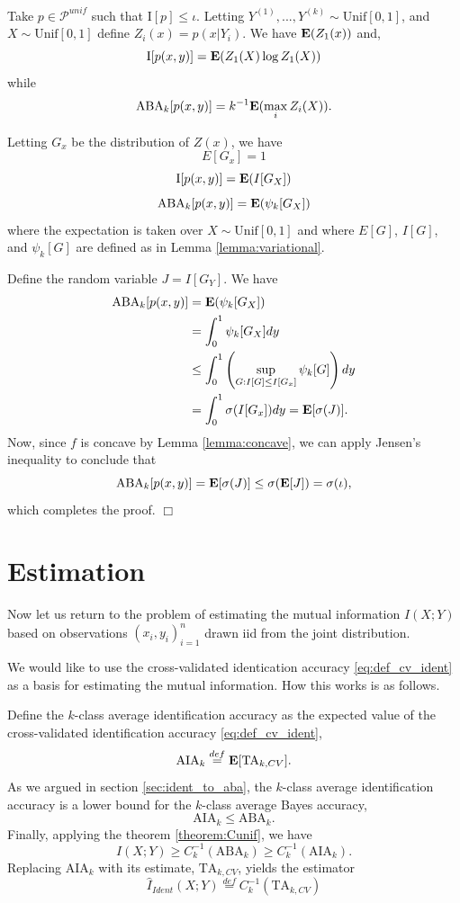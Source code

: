 Take $p \in \mathcal{P}^{unif}$ such that $\text{I}[p] \leq \iota$.
Letting $Y^{(1)},...,Y^{(k)} \sim \text{Unif}[0,1]$, and $X \sim \text{Unif}[0,1]$ define $Z_i(x) = p(x|Y_i)$.
We have $\textbf{E}(Z_1(x))$ and,
\[
\text{I}[p(x,y)] = \textbf{E}(Z_1(X) \log Z_1(X))
\]
while
\[
\text{ABA}_k[p(x,y)] = k^{-1}\textbf{E}(\max_i Z_i(X)).
\]

Letting $G_x$ be the distribution of $Z(x)$, we have
\[
E[G_x] = 1
\]
\[
\text{I}[p(x,y)] = \textbf{E}(I[G_X])
\]
\[
\text{ABA}_k[p(x,y)] = \textbf{E}(\psi_k[G_X])
\]
where the expectation is taken over $X \sim \text{Unif}[0,1]$ and
where $E[G]$, $I[G]$, and $\psi_k[G]$ are defined as in
Lemma \ref{lemma:variational}.

Define the random variable $J = I[G_Y]$.
We have
\begin{align*}
\text{ABA}_k[p(x,y)] &= \textbf{E}(\psi_k[G_X])
\\&= \int_0^1 \psi_k[G_X] dy
\\&\leq \int_0^1 \left(\sup_{G: I[G] \leq I[G_x]} \psi_k[G]\right) dy
\\&= \int_0^1 \sigma(I[G_x]) dy = \textbf{E}[\sigma(J)].
\end{align*}
Now, since $f$ is concave by Lemma \ref{lemma:concave},
we can apply Jensen's inequality to conclude that
\[
\text{ABA}_k[p(x,y)] = \textbf{E}[\sigma(J)] \leq \sigma(\textbf{E}[J]) = \sigma(\iota),
\]
which completes the proof. $\Box$



\section{Estimation}\label{sec:ch4_estimation}

Now let us return to the problem of estimating the mutual information
$I(X; Y)$ based on observations $(x_i, y_i)_{i=1}^n$ drawn iid from
the joint distribution.

We would like to use the cross-validated identication accuracy
\eqref{eq:def_cv_ident} as a basis for estimating the mutual
information.  How this works is as follows.

Define the $k$-class average identification accuracy as the expected
value of the cross-validated identification accuracy \eqref{eq:def_cv_ident},
\[
\text{AIA}_k \stackrel{def}{=} \textbf{E}[\text{TA}_{k, CV}].
\]
As we argued in section \ref{sec:ident_to_aba}, the $k$-class average
identification accuracy is a lower bound for the $k$-class average
Bayes accuracy,
\[
\text{AIA}_k \leq \text{ABA}_k.
\]
Finally, applying the theorem \ref{theorem:Cunif}, we have
\[
I(X; Y) \geq C^{-1}_k(\text{ABA}_k) \geq C^{-1}_k(\text{AIA}_k).
\]
Replacing $\text{AIA}_k$ with its estimate, $\text{TA}_{k, CV}$, yields the estimator
\[
\hat{I}_{Ident}(X; Y) \stackrel{def}{=} C^{-1}_k(\text{TA}_{k, CV}) 
\]


